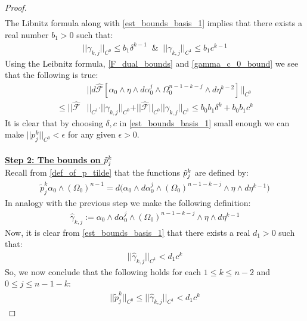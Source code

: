 \documentclass[10pt,a4paper]{amsart}
\begin{document}
\begin{proof}
\begin{align}
\end{align}
The Libnitz formula along with \eqref{est_bounds_basis_1} implies that there exists a real number $b_1>0$ such that:
\begin{align}\label{gamma_c_0_bound}
    \vert\vert\gamma_{k,j}\vert\vert_{C^0} \leq b_1 \delta^{k-1} \; \;  \& \;\; \vert\vert\gamma_{k,j}\vert\vert_{C^1} \leq b_1 c^{k-1}
\end{align} 
Using the Leibnitz formula, \eqref{F_dual_bounds} and \eqref{gamma_c_0_bound} we see that the following is true:
\begin{align}\label{p_kj_bound_1}
    &\vert\vert d\hat{\mathcal{F}}[\alpha_0 \wedge \eta \wedge d\alpha^j_0 \wedge \Omega^{n-1-k-j}_0 \wedge d\eta^{k-2}]\vert\vert_{C^0} \\\nonumber \leq
     \vert\vert\hat{\mathcal{F}}&\vert\vert_{C^1} \cdot \vert\vert\gamma_{k,j}\vert\vert_{C^0} + \vert\vert\hat{\mathcal{F}}\vert\vert_{C^0} \vert\vert\gamma_{k,j}\vert\vert_{C^1} \leq b_0b_1 \delta^k + b_0b_1 c^k
\end{align} 
It is clear that by choosing $\delta, c$ in \eqref{est_bounds_basis_1} small enough we can make $\vert\vert p^k_{j}\vert\vert_{C^0} < \epsilon$ for any given $\epsilon >0$.\\
\\
\textbf{\underline{Step 2: The bounds on $\Tilde{p}^{k}_{j}$}}
\\
Recall from \eqref{def_of_p_tilde} that the functions $\Tilde{p}^k_j$ are defined by:
\begin{align*}
     \tilde{p}^k_j \alpha_0 \wedge (\Omega_0)^{n-1} = d\big(\alpha_0 \wedge d\alpha^j_0 \wedge (\Omega_0)^{n-1-k-j}\wedge \eta \wedge d\eta^{k-1}\big)
\end{align*}
In analogy with the previous step we make the following definition:
\begin{align}
    \hat{\gamma}_{k,j}:= \alpha_0 \wedge d\alpha^j_0 \wedge (\Omega_0)^{n-1-k-j}\wedge \eta \wedge d\eta^{k-1}
\end{align}
Now, it is clear from \eqref{est_bounds_basis_1} that there exists a real $d_1 >0$ such that:
\begin{align}
    \vert\vert\hat{\gamma}_{k,j}\vert\vert_{C^1} < d_1c^k
\end{align}
So, we now conclude that the following holds for each $1 \leq k \leq n-2$ and $0\leq j \leq n-1-k$:
\begin{align}
\vert\vert \tilde{p}^k_j\vert\vert_{C^0} \leq  \vert\vert\hat{\gamma}_{k,j}\vert\vert_{C^1} <  d_1c^{k}
\end{align}

\end{proof}
\end{document}
